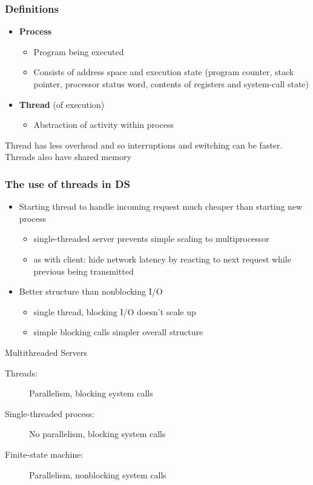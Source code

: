 \subsubsection{Definitions}
\begin{itemize}
	\item\textbf{Process}
	\begin{itemize}
		\item Program being executed
		\item Consists of address space and execution state (program counter, stack pointer, processor status word, contents of registers and system-call state)
	\end{itemize}
	\item\textbf{Thread} (of execution)
	\begin{itemize}
		\item Abstraction of activity within process
	\end{itemize}
\end{itemize}
Thread has less overhead and so interruptions and switching can be faster. Threads also have shared memory



\subsubsection{The use of threads in DS}
\begin{itemize}
	\item Starting thread to handle incoming request much cheaper than starting new process
	\begin{itemize}
		\item single-threaded server prevents simple scaling to multiprocessor
		\item as with client: hide network latency by reacting to next request while previous being transmitted
	\end{itemize}
	\item Better structure than nonblocking I/O
	\begin{itemize}
		\item single thread, blocking I/O doesn't scale up
		\item simple blocking calls simpler overall structure
	\end{itemize}	
\end{itemize}
\begin{note}{Multithreaded Servers}
	\begin{description}
		\item[Threads:] Parallelism, blocking system calls
		\item[Single-threaded process:] No parallelism, blocking system calls
		\item[Finite-state machine:] Parallelism, nonblocking system calls
	\end{description}
\end{note}


